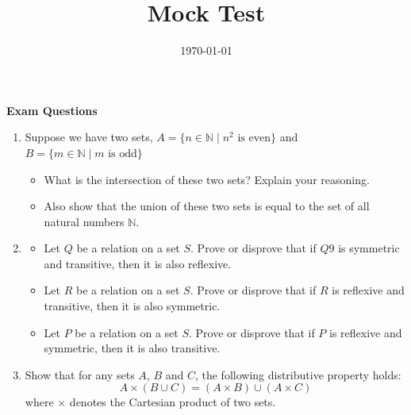 \documentclass{article}
\begin{document}
\title{Mock Test}
\date{\today}
\maketitle
\textbf{Exam Questions}
\begin{enumerate}
    \item Suppose we have two sets, $A = \{n \in \mathbb{N} \mid n^2 \text{ is even}\}$ and $B = \{m \in \mathbb{N} \mid m \text{ is odd}\}$
    \begin{itemize}
        \item What is the intersection of these two sets? Explain your reasoning. \item Also show that the union of these two sets is equal to the set of all natural numbers $\mathbb{N}$.
    \end{itemize}
    \item \begin{itemize}
    \item Let $Q$ be a relation on a set $S$. Prove or disprove that if $Q9$ is symmetric and transitive, then it is also reflexive.
    \item Let $R$ be a relation on a set $S$. Prove or disprove that if $R$ is reflexive and transitive, then it is also symmetric.
    \item Let $P$ be a relation on a set $S$. Prove or disprove that if $P$ is reflexive and symmetric, then it is also transitive.
    \end{itemize}
    \item Show that for any sets $A$, $B$ and $C$, the following distributive property holds:
    $$A \times (B \cup C) = (A \times B) \cup (A \times C)$$
    where $\times$ denotes the Cartesian product of two sets.
\end{enumerate}
\end{document}
